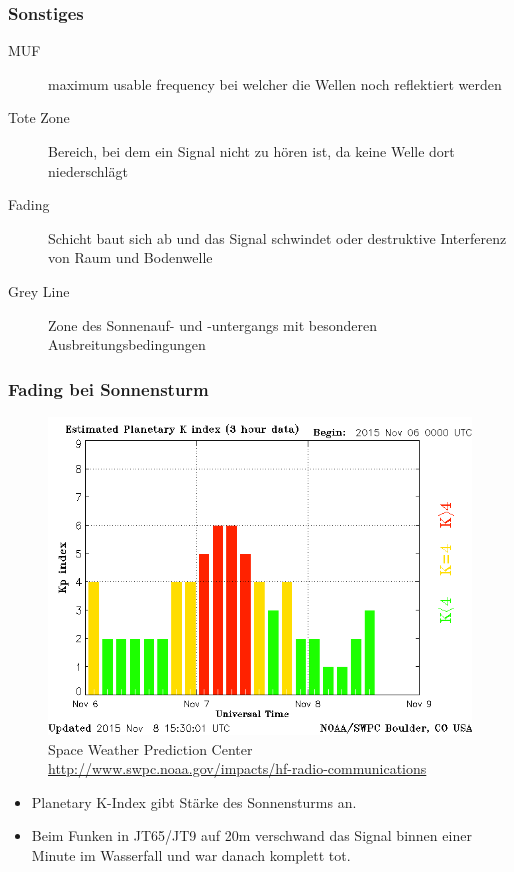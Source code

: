 \begin{frame}
    \frametitle{Sonstiges}
    \begin{description}
      \item[MUF] maximum usable frequency bei welcher die Wellen noch reflektiert werden
      \item[Tote Zone] Bereich, bei dem ein Signal nicht zu hören ist, da keine Welle dort niederschlägt
      \item[Fading] Schicht baut sich ab und das Signal schwindet oder destruktive Interferenz von Raum und Bodenwelle
      \item[Grey Line] Zone des Sonnenauf- und -untergangs mit besonderen Ausbreitungsbedingungen
    \end{description}
\end{frame}

\begin{frame}
  \frametitle{Fading bei Sonnensturm}
  \begin{center}
    \begin{figure}
    \includegraphics[width=.8\textwidth,height=.55\textheight,keepaspectratio]{e09/planetary-k-index.png}
    \caption{Space Weather Prediction Center \ExternalLink \url{http://www.swpc.noaa.gov/impacts/hf-radio-communications}}
    \end{figure}
    \begin{itemize}
    \item Planetary K-Index gibt Stärke des Sonnensturms an. 
    \item Beim Funken in JT65/JT9 auf 20m verschwand das Signal binnen einer Minute im Wasserfall und war danach komplett tot.
    \end{itemize}
  \end{center}
\end{frame}

